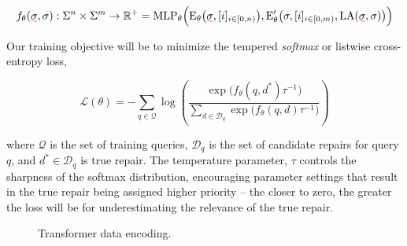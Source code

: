 \documentclass[sigplan,review,acmsmall,nonacm,screen,anonymous]{acmart}\settopmatter{printfolios=false,printccs=false,printacmref=false}
\begin{document}
\[
f_\theta(\err\sigma, \sigma): \Sigma^n \times \Sigma^m \rightarrow \mathbb{R}^+ = \text{MLP}_{\theta}\Big(\text{E}_\theta\big(\err\sigma, [i]_{i\in [0, n)}\big), \text{E}_\theta'\big(\sigma, [i]_{i \in [0, m)}, \text{LA}(\err\sigma, \sigma)\big)\Big)
\]

\noindent Our training objective will be to minimize the tempered \textit{softmax} or listwise cross-entropy loss,

\begin{equation}
\mathcal{L}(\theta) = -\sum_{q \in \mathcal{Q}} \log \left( \frac{\exp\big(f_\theta(q, d^*)\tau^{-1}\big)}{\sum_{d \in \mathcal{D}_q} \exp\big(f_\theta(q, d)\tau^{-1}\big)} \right)
\end{equation}

\noindent where $\mathcal{Q}$ is the set of training queries, $\mathcal{D}_q$ is the set of candidate repairs for query $q$, and $d^* \in \mathcal{D}_q$ is true repair. The temperature parameter, $\tau$ controls the sharpness of the softmax distribution, encouraging parameter settings that result in the true repair being assigned higher priority -- the closer to zero, the greater the loss will be for underestimating the relevance of the true repair.

\begin{figure}
\caption{Transformer data encoding.}\label{fig:tx_data_encoding}
\end{figure}
\end{document}
